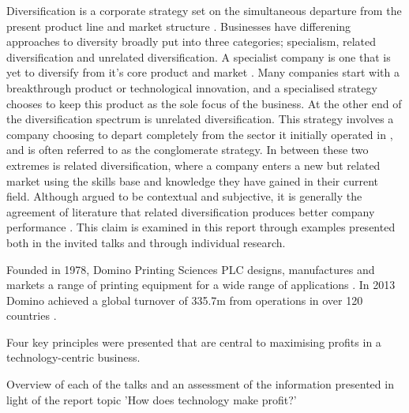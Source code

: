 \documentclass{elec6049Report}     %
\newcommand{\inote}[1] {\todo[inline]{#1}}
\begin{document}
Diversification is a corporate strategy set on the simultaneous departure from the present product line and market structure \cite{ansoff1957strategies}.
Businesses have differening approaches to diversity broadly put into three categories; specialism, related diversification and unrelated diversification. 
A specialist company is one that is yet to diversify from it's core product and market \cite{johnson2008exploring}. 
Many companies start with a breakthrough product or technological innovation, and a specialised strategy chooses to keep this product as the sole focus of the business.
At the other end of the diversification spectrum is unrelated diversification. This strategy involves a company choosing to depart completely from the sector it initially operated in \cite{johnson2008exploring}, and is often referred to as the conglomerate strategy.
In between these two extremes is related diversification, where a company enters a new but related market using the skills base and knowledge they have gained in their current field. 
Although argued to be contextual and subjective, it is generally the agreement of literature that related diversification produces better company performance \cite{johnson2008exploring, SMJ:SMJ334, SMJ:SMJ82}. This claim is examined in this report through examples presented both in the invited talks and through individual research.







 \label{Sect1}
Founded in 1978, Domino Printing Sciences PLC designs, manufactures and markets a range of printing equipment for a wide range of applications \cite{DominoAnnual}. In 2013 Domino achieved a global turnover of \textsterling335.7m from operations in over 120 countries \cite{DominoFactsheet}. 

Four key principles were presented that are central to maximising profits in a technology-centric business. 
 

Overview of each of the talks and an assessment of the information presented in light of the report topic 'How does technology make profit?' 
\end{document}
